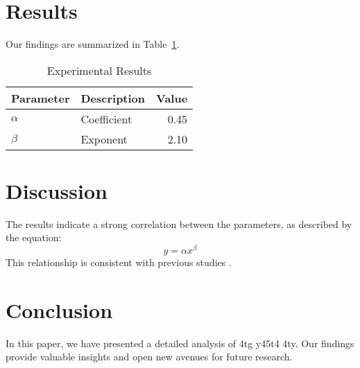 \documentclass[12pt]{article}
\begin{document}
\section{Results}
Our findings are summarized in Table~\ref{tab:results}.

\begin{table}[h]
    \centering
    \caption{Experimental Results}
    \label{tab:results}
    \begin{tabular}{@{}llr@{}}
        \toprule
        Parameter & Description & Value \\
        \midrule
        $\alpha$ & Coefficient & 0.45 \\
        $\beta$ & Exponent & 2.10 \\
        \bottomrule
    \end{tabular}
\end{table}

\section{Discussion}
The results indicate a strong correlation between the parameters, as described by the equation:
\begin{equation}
    y = \alpha x^\beta
\end{equation}
This relationship is consistent with previous studies \cite{ref1}.

\section{Conclusion}
In this paper, we have presented a detailed analysis of 4tg y45t4 4ty. Our findings provide valuable insights and open new avenues for future research.

\printbibliography
\end{document}
